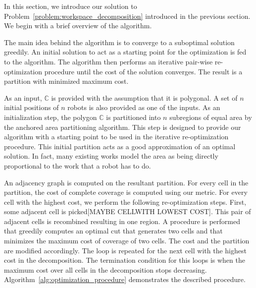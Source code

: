 \documentclass[../main.tex]{subfiles}
\begin{document}
In this section, we introduce our solution to Problem~\ref{problem:workspace_decomposition} introduced in the previous section. We begin with a brief overview of the algorithm.

The main idea behind the algorithm is to converge to a suboptimal solution greedily. An initial solution to act as a starting point for the optimization is fed to the algorithm. The algorithm then performs an iterative pair-wise re-optimization procedure until the cost of the solution converges. The result is a partition with minimized maximum cost. 

As an input, $\mathbb{C}$ is provided with the assumption that it is polygonal. A set of $n$ initial positions of $n$ robots is also provided as one of the inputs. As an initialization step, the polygon $\mathbb{C}$ is partitioned into $n$ subregions of equal area by the anchored area partitioning algorithm. This step is designed to provide our algorithm  with a starting point to be used in the iterative re-optimization procedure. This initial partition acts as a good approximation of an optimal solution. In fact, many existing works model the area as being directly proportional to the work that a robot has to do.

An adjacency graph is computed on the resultant partition. For every cell in the partition, the cost of complete coverage is computed using our metric. For every cell with the highest cost, we perform the following re-optimization steps. First, some adjacent cell is picked[MAYBE CELLWITH LOWEST COST]. This pair of adjacent cells is recombined resulting in one region. A procedure is performed that greedily computes an optimal cut that generates two cells and that minimizes the maximum cost of coverage of two cells. The cost and the partition are modified accordingly. The loop is repeated for the next cell with the highest cost in the decomposition. The termination condition for this loops is when the maximum cost over all cells in the decomposition stops decreasing. Algorithm~\ref{alg:optimization_procedure} demonstrates the described procedure.
\end{document}
